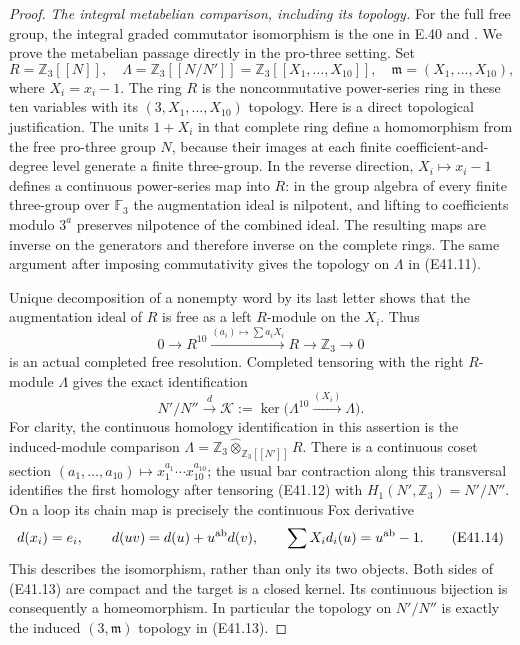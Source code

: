 \begin{proof}
\emph{The integral metabelian comparison, including its topology.}
For the full free group, the integral graded commutator
isomorphism is the one in E.40 and
\cite[Theorem 2.1]{E_KochKukkukLabute}.
We prove the metabelian passage directly in the
pro-three setting. Set
\[
 R=\mathbb Z_3[[N]],\quad
 \Lambda=\mathbb Z_3[[N/N']]
      =\mathbb Z_3[[X_1,\ldots,X_{10}]],\quad
 \mathfrak m=(X_1,\ldots,X_{10}),
 \tag{E41.11}
\]
where $X_i=x_i-1$. The ring $R$ is the noncommutative
power-series ring in these ten variables with its
$(3,X_1,\ldots,X_{10})$ topology. Here is a direct
topological justification. The units $1+X_i$ in that
complete ring define a homomorphism from the free
pro-three group $N$, because their images at each
finite coefficient-and-degree level generate a
finite three-group. In the reverse direction,
$X_i\mapsto x_i-1$ defines a continuous power-series
map into $R$: in the group algebra of every finite
three-group over $\mathbb F_3$ the augmentation ideal
is nilpotent, and lifting to coefficients modulo
$3^a$ preserves nilpotence of the combined ideal.
The resulting maps are inverse on the generators
and therefore inverse on the complete rings.
The same argument after imposing commutativity
gives the topology on $\Lambda$ in (E41.11).

Unique decomposition of a nonempty word by its last
letter shows that the augmentation ideal of $R$ is
free as a left $R$-module on the $X_i$. Thus
\[
 0\longrightarrow R^{10}
     \xrightarrow{(a_i)\mapsto\sum a_iX_i}R
     \longrightarrow\mathbb Z_3\longrightarrow0
 \tag{E41.12}
\]
is an actual completed free resolution. Completed
tensoring with the right $R$-module $\Lambda$ gives
the exact identification
\[
 N'/N''\xrightarrow{\ d\ }\mathcal K
 :=\ker\bigl(\Lambda^{10}\xrightarrow{(X_i)}\Lambda\bigr).
 \tag{E41.13}
\]
For clarity, the continuous homology identification
in this assertion is the induced-module comparison
$\Lambda=\mathbb Z_3\widehat\otimes_{\mathbb Z_3[[N']]}R$.
There is a continuous coset section
$(a_1,\ldots,a_{10})\mapsto x_1^{a_1}\cdots x_{10}^{a_{10}}$;
the usual bar contraction along this transversal
identifies the first homology after tensoring
(E41.12) with $H_1(N',\mathbb Z_3)=N'/N''$.
On a loop its chain map is precisely the continuous
Fox derivative
\[
 d(x_i)=e_i,\qquad d(uv)=d(u)+u^{\rm ab}d(v),\qquad
       \sum X_i d_i(u)=u^{\rm ab}-1.
 \tag{E41.14}
\]
This describes the isomorphism, rather than only
its two objects. Both sides of (E41.13) are compact
and the target is a closed kernel. Its continuous
bijection is consequently a homeomorphism. In
particular the topology on $N'/N''$ is exactly the
induced $(3,\mathfrak m)$ topology in (E41.13).


\end{proof}
